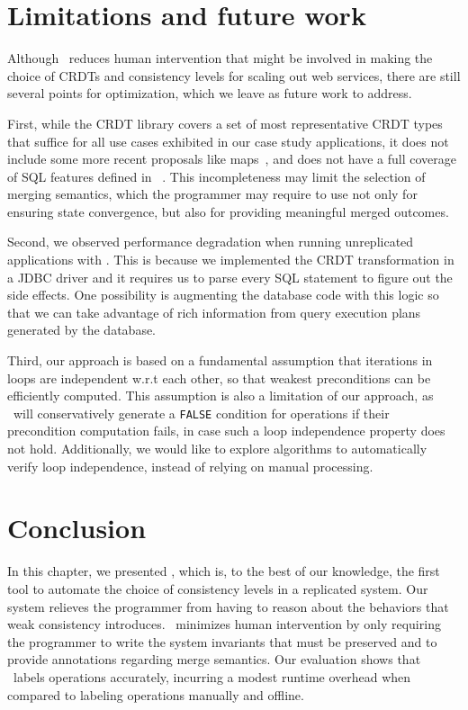 \section{Limitations and future work}
\label{ch:sieve:sect:limitation}
Although \tool\ reduces human intervention that might be involved in making the choice of
CRDTs and consistency levels for scaling out web services, there are still several points for optimization, 
which we leave as future work to address.

First, while the CRDT library covers a set of
most representative CRDT types that suffice for all use cases exhibited in our case study applications,
it does not include some more recent proposals like maps~\cite{riakmap},
and does not have a full coverage of SQL features defined in ~\cite{SQLStandard}. This incompleteness
may limit the selection of merging semantics, which the programmer may require to use not only for ensuring
state convergence, but also for providing meaningful merged outcomes.

Second, we observed performance degradation
when running unreplicated applications with \tool. This is because we implemented the CRDT
transformation in a JDBC driver and it requires us to parse every SQL statement to figure out
the side effects. One possibility is augmenting the database code with this logic so that
we can take advantage of rich information from query execution plans generated by the database.

Third, our approach is based on a fundamental assumption that 
iterations in loops are independent w.r.t each other, 
so that weakest preconditions can be efficiently computed. This assumption is also 
a limitation of our approach, as \tool\ will conservatively generate a {\tt FALSE} condition
for operations if their precondition computation fails, in case such a loop independence
property does not hold. Additionally,
we would like to explore algorithms to automatically verify loop independence,
instead of relying on manual processing.

\section{Conclusion}
\label{ch:sieve:sect:conclude}

In this chapter, we presented \tool, which is, to the best of our knowledge, 
the first tool to automate the choice of consistency levels in a replicated system. Our
system relieves the programmer from having to reason about the
behaviors that weak consistency introduces. \tool\ minimizes
human intervention by only requiring the
programmer to write the system invariants that must be preserved
and to provide annotations regarding merge semantics. Our
evaluation shows that \tool\ labels operations accurately, incurring a modest
runtime overhead when compared to labeling operations manually and
offline.
